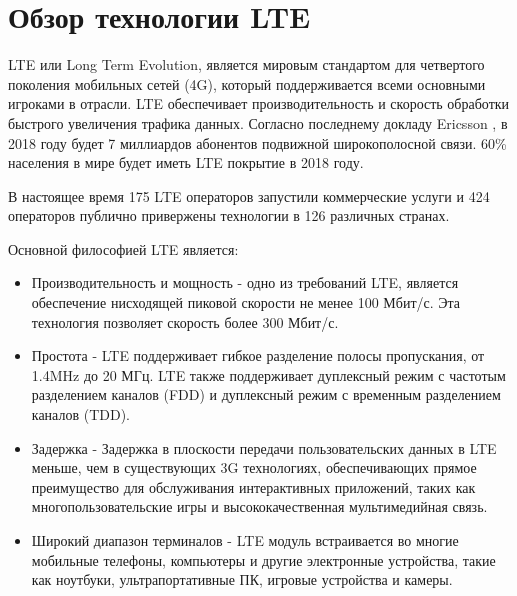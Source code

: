 \section{Обзор технологии LTE} \label{sect1_2}

LTE или Long Term Evolution, является мировым стандартом для четвертого поколения мобильных сетей (4G), который поддерживается всеми основными игроками в отрасли. LTE обеспечивает производительность и скорость обработки быстрого увеличения трафика данных. Согласно последнему докладу Ericsson \cite{ericsson}, в 2018 году будет 7 миллиардов абонентов подвижной широкополосной связи. 60\% населения в мире будет иметь LTE покрытие в 2018 году.

В настоящее время 175 LTE операторов запустили коммерческие услуги и 424 операторов публично привержены технологии в 126 различных странах.

Основной философией LTE является:
\begin{itemize}
\item Производительность и мощность - одно из требований LTE, является обеспечение нисходящей пиковой скорости не менее 100 Мбит/с. Эта технология позволяет скорость более 300 Мбит/с.

\item Простота - LTE поддерживает гибкое разделение полосы пропускания, от 1.4MHz до 20 МГц. LTE также поддерживает дуплексный режим с частотым разделением каналов (FDD) и дуплексный режим с временным разделением каналов (TDD).

\item Задержка - Задержка в плоскости передачи пользовательских данных в LTE меньше, чем в существующих 3G технологиях, обеспечивающих прямое преимущество для обслуживания интерактивных приложений, таких как многопользовательские игры и высококачественная мультимедийная связь.

\item Широкий диапазон терминалов - LTE модуль встраивается во многие мобильные телефоны, компьютеры и другие электронные устройства, такие как ноутбуки, ультрапортативные ПК, игровые устройства и камеры.
\end{itemize}

